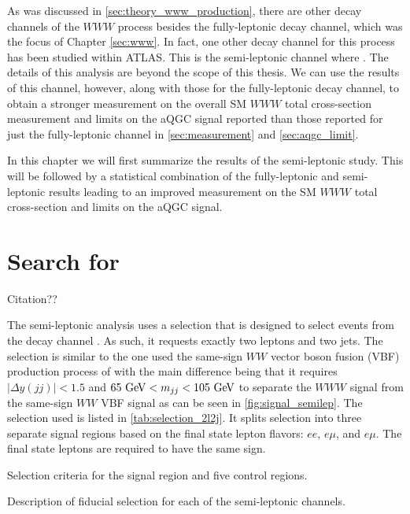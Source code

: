 
As was discussed in \sec\ref{sec:theory_www_production}, there are other decay
channels of the $WWW$ process besides the fully-leptonic decay channel,
which was the focus of Chapter \ref{sec:www}.  
In fact, one other decay channel for this process has been studied within 
ATLAS. This is the semi-leptonic channel where \wwwlljj. The details of this 
analysis are beyond the scope of this thesis. We can use the results of this channel,
however, along with those for the fully-leptonic decay channel, to obtain a stronger measurement
on the overall SM $WWW$ total cross-section measurement and limits on the aQGC signal reported than
those reported for just the fully-leptonic 
channel in \sec\ref{sec:measurement} and \sec\ref{sec:aqgc_limit}. 


In this chapter we will first summarize the results of the semi-leptonic study. 
This will be followed by a statistical combination of the fully-leptonic and semi-leptonic
results leading to an improved  
measurement on the SM $WWW$ total cross-section and limits on the 
aQGC signal.




\section{Search for \wwwlljj}
\label{sec:semilep}

Citation??

The semi-leptonic analysis uses a selection that is designed
to select events from the decay channel \wwwlljj. As such, 
it requests exactly two leptons and two jets.  The selection is similar
to the one used the same-sign $WW$ vector boson fusion (VBF) production process of
\cite{PhysRevLett.113.141803} with the main difference being that
it requires $|\Delta y(jj)| < 1.5$ and $65 \GeV < m_{jj} < 105 \GeV$
to separate the $WWW$ signal from the same-sign $WW$ VBF signal as can be
seen in \fig\ref{fig:signal_semilep}. The selection used is listed in \tab\ref{tab:selection_2l2j}.
It splits selection into three separate signal regions based on the final
state lepton flavors: $ee$, $e\mu$, and $e\mu$. The final state leptons
are required to have the same sign.

\begin{table}[ht]
\tiny

\caption{\label{tab:selection_2l2j} Selection criteria for the signal region and five control regions.}
\end{table}

\begin{table}[ht!]
\centering
\begin{footnotesize}

\end{footnotesize}
\caption{Description of fiducial selection for each of the semi-leptonic channels.  }
\label{tab:fiducial_selection_2l2j}
\end{table}

